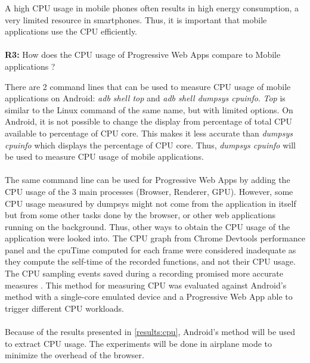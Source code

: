 \documentclass{kththesis}
\begin{document}
A high CPU usage in mobile phones often results in high energy consumption, a very limited resource in smartphones. Thus, it is important that mobile applications use the CPU efficiently.

\paragraph{}
\textbf{R3:} How does the CPU usage of Progressive Web Apps compare to Mobile applications ?


There are 2 command lines that can be used to measure CPU usage of mobile applications on Android: \textit{adb shell top} and \textit{adb shell dumpsys cpuinfo}. \textit{Top} is similar to the Linux command of the same name, but with limited options. On Android, it is not possible to change the display from percentage of total CPU available to percentage of CPU core. This makes it less accurate than \textit{dumpsys cpuinfo} which displays the percentage of CPU core. Thus, \textit{dumpsys cpuinfo} will be used to measure CPU usage of mobile applications. 

\paragraph{}
The same command line can be used for Progressive Web Apps by adding the CPU usage of the 3 main processes (Browser, Renderer, GPU). 
However, some CPU usage measured by dumpsys might not come from the application in itself but from some other tasks done by the browser, or other web applications running on the background. 
Thus, other ways to obtain the CPU usage of the application were looked into.
The CPU graph from Chrome Devtools performance panel and the cpuTime computed for each frame were considered inadequate as they compute the self-time of the recorded functions, and not their CPU usage. The CPU sampling events saved during a recording promised more accurate measures \cite{cpu_sampling}. This method for measuring CPU was evaluated against Android's method with a single-core emulated device and a Progressive Web App able to trigger different CPU workloads. \newline

\paragraph{}
Because of the results presented in \autoref{results:cpu}, Android's method will be used to extract CPU usage. The experiments will be done in airplane mode to minimize the overhead of the browser. 
\end{document}
